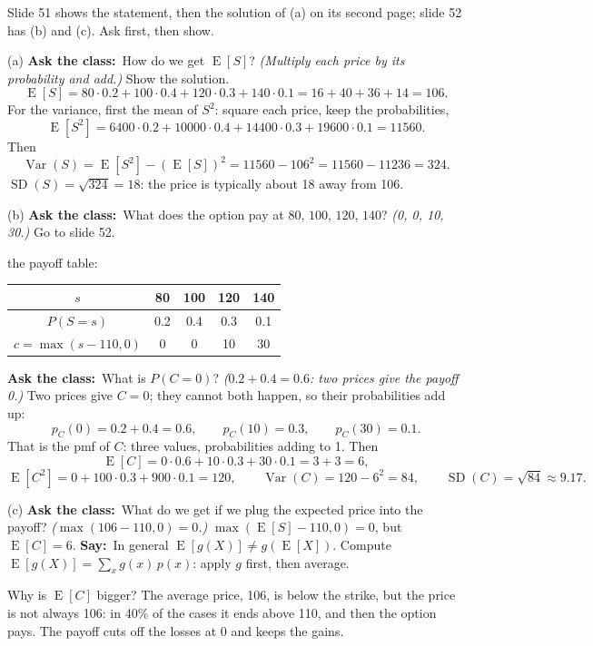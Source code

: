 \documentclass[11pt,a4paper,parskip=half]{scrartcl}
\newcommand{\E}{\operatorname{E}}
\newcommand{\Var}{\operatorname{Var}}
\newcommand{\SD}{\operatorname{SD}}
\newcommand{\say}{\textbf{\color{teal}Say:}\ }
\newcommand{\ask}{\textbf{\color{navy}Ask the class:}\ }
\begin{document}
\begin{slidecue}
	Slide 51 shows the statement, then the solution of (a) on its second
	page; slide 52 has (b) and (c). Ask first, then show.
\end{slidecue}

(a) \ask How do we get $\E[S]$? \emph{(Multiply each price by its
probability and add.)} Show the solution.
\[ \E[S]=80\cdot0.2+100\cdot0.4+120\cdot0.3+140\cdot0.1=16+40+36+14=106. \]
For the variance, first the mean of $S^2$: square each price, keep the
probabilities,
\[ \E[S^2]=6400\cdot0.2+10000\cdot0.4+14400\cdot0.3+19600\cdot0.1=11560. \]
Then
\[ \Var(S)=\E[S^2]-(\E[S])^2=11560-106^2=11560-11236=324. \]
$\SD(S)=\sqrt{324}=18$: the price is typically about 18 away from 106.

(b) \ask What does the option pay at $80$, $100$, $120$, $140$? \emph{(0,
0, 10, 30.)} Go to slide 52.

\needspace{0.15\textheight}
\begin{slidefig}
	the payoff table:
	\begin{center}
		\begin{tabular}{c|cccc}
			$s$               & 80  & 100 & 120 & 140 \\\hline
			$P(S=s)$          & 0.2 & 0.4 & 0.3 & 0.1 \\
			$c=\max(s-110,0)$ & 0   & 0   & 10  & 30
		\end{tabular}
	\end{center}
\end{slidefig}

\ask What is $P(C=0)$? \emph{($0.2+0.4=0.6$: two prices give the payoff
0.)} Two prices give $C=0$; they cannot both happen, so their
probabilities add up:
\[ p_C(0)=0.2+0.4=0.6,\qquad p_C(10)=0.3,\qquad p_C(30)=0.1. \]
That is the pmf of $C$: three values, probabilities adding to 1. Then
\[ \E[C]=0\cdot0.6+10\cdot0.3+30\cdot0.1=3+3=6, \]
\[ \E[C^2]=0+100\cdot0.3+900\cdot0.1=120,\qquad
	\Var(C)=120-6^2=84,\qquad \SD(C)=\sqrt{84}\approx9.17. \]

(c) \ask What do we get if we plug the expected price into the payoff?
\emph{($\max(106-110,0)=0$.)} $\max(\E[S]-110,0)=0$, but $\E[C]=6$.
\say In general $\E[g(X)]\ne g(\E[X])$. Compute
$\E[g(X)]=\sum_x g(x)\,p(x)$: apply $g$ first, then average.

Why is $\E[C]$ bigger? The average price, 106, is below the strike, but
the price is not always 106: in 40\% of the cases it ends above 110, and
then the option pays. The payoff cuts off the losses at 0 and keeps the
gains.
\end{document}
